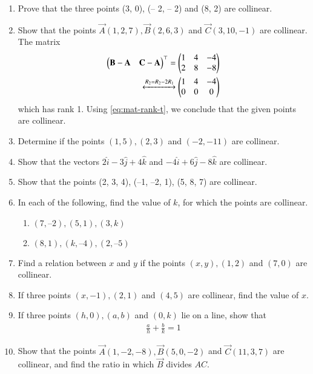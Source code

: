 \begin{enumerate}[label=\thesubsection.\arabic*, ref=\thesubsection.\theenumi]
\item 
Prove that the three points (3,  0),  (– 2,  – 2) and (8,  2) are collinear.
\label{chapters/11/10/2/20}
	\\
	\solution 

\item Show that the points $\vec{A}(1, 2, 7),  \vec{B}(2, 6, 3)$ and $\vec{C}(3, 10, -1)$ are collinear.
	\\
		\solution The matrix
\begin{align}
	\begin{pmatrix}\mathbf{B}-\mathbf{A}& \mathbf{C}-\mathbf{A}\end{pmatrix}^\top 
	= \begin{pmatrix}1 & 4 & -4 \\ 2 & 8 & -8\end{pmatrix}
	\\
	\xleftrightarrow[]{R_2 = R_2 - 2R_1}
	 \begin{pmatrix}1 & 4 & -4 \\ 0 & 0 & 0\end{pmatrix}
\end{align}
which has rank 1.  Using 
			\eqref{eq:mat-rank-t}, 
			 we conclude that the given points are collinear.
\item Determine if the points $(1, 5), (2, 3)$ and $(-2, -11)$ are collinear.
\item Show that the vectors $2\hat{i}-3\hat{j}+4\hat{k}$ and $-4\hat{i}+6\hat{j}-8\hat{k}$ are collinear.
\item Show that the points (2,  3,  4),  (–1,  –2,  1),  (5,  8,  7) are collinear.
\item In each of the following,  find the value of $k$,  for which the points are collinear.
\begin{enumerate}
\item $(7,  –2),  (5,  1),  (3,  k)$
\item $(8,  1),  (k,  – 4),  (2,  –5)$
\end{enumerate}
		\label{10/7/3/2}
\item Find a relation between $x$ and $y$ if the points $(x,  y),  (1,  2)$  and  $(7,  0)$ are collinear.
\item If three points $(x,  -1),  (2,  1)$ and $(4,  5)$ are collinear,  find the value of $x$.
\label{chapters/11/10/1/8}
\item If three points $(h,  0),  (a,  b)$ and $(0,  k)$ lie on a line,  
show that 
\begin{align}
\frac{a}{h}+\frac{b}{k}=1
\end{align}
\label{chapters/11/10/1/13}
\item Show that the points $\vec{A} (1,  -2,  -8),  \vec{B} (5,  0,  -2)$ and $\vec{C} (11,  3,  7)$ are collinear,  and find the ratio in which $\vec{B}$ divides $AC$.

\end{enumerate}
